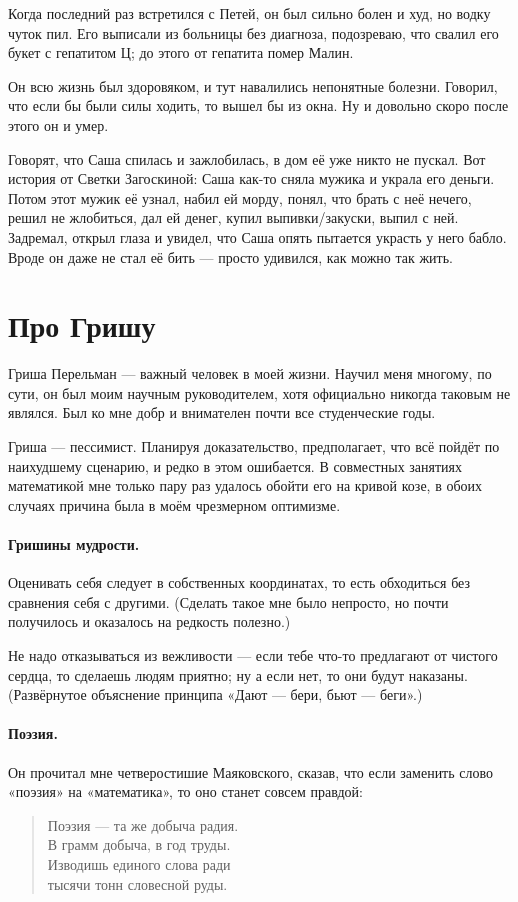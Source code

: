 \documentclass{book}
\begin{document}
Когда последний раз встретился с Петей, он был сильно болен и худ, но водку чуток пил.
Его выписали из больницы без диагноза, подозреваю, что свалил его букет с гепатитом Ц;
до этого от гепатита помер Малин.

Он всю жизнь был здоровяком, и тут навалились непонятные болезни.
Говорил, что если бы были силы ходить, то вышел бы из окна.
Ну и довольно скоро после этого он и умер.

Говорят, что Саша спилась и зажлобилась, в дом её уже никто не пускал.
Вот история от Светки Загоскиной:
Саша как-то сняла мужика и украла его деньги.
Потом этот мужик её узнал, набил ей морду, понял, что брать с неё нечего, решил не жлобиться, дал ей денег, купил выпивки/закуски, выпил с ней.
Задремал, открыл глаза и увидел, что Саша опять пытается украсть у него бабло.
Вроде он даже не стал её бить --- просто удивился, как можно так жить.

\section*{Про Гришу}

Гриша Перельман --- важный человек в моей жизни.
Научил меня многому, по сути, он был моим научным руководителем, хотя официально никогда таковым не являлся.
Был ко мне добр и внимателен почти все студенческие годы.

Гриша --- пессимист.
Планируя доказательство, предполагает, что всё пойдёт по наихудшему сценарию, и редко в этом ошибается.
В совместных занятиях математикой мне только пару раз удалось обойти его на кривой козе, в обоих случаях причина была в моём чрезмерном оптимизме.

\paragraph{Гришины мудрости.}
Оценивать себя следует в собственных координатах, то есть обходиться без сравнения себя с другими.
(Сделать такое мне было непросто, но почти получилось и оказалось на редкость полезно.)

Не надо отказываться из вежливости  --- если тебе что-то предлагают от чистого сердца, то сделаешь людям приятно; ну а если нет, то они будут наказаны.
(Развёрнутое объяснение принципа «Дают --- бери, бьют --- беги».)

\paragraph{Поэзия.}
Он прочитал мне четверостишие Маяковского,
сказав, что если заменить слово «поэзия» на «математика», то оно станет совсем правдой: 
\begin{verse}
Поэзия — та же добыча радия.\\
В грамм добыча, в год труды.\\
Изводишь единого слова ради\\
тысячи тонн словесной руды.\\
\end{verse}
\end{document}
